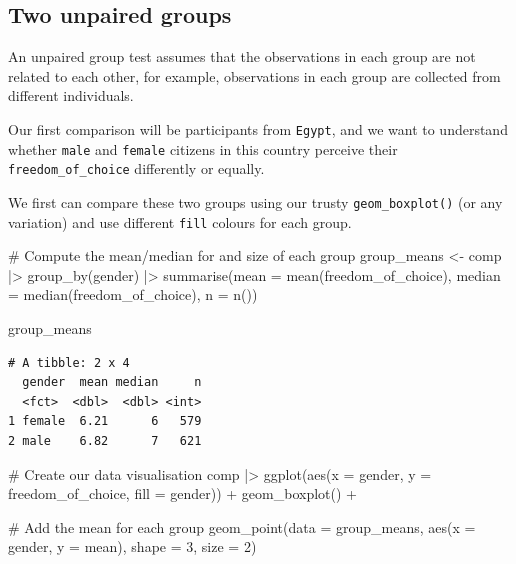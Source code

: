 \documentclass[
  letterpaper,
  DIV=11,
  numbers=noendperiod]{scrreprt}
\newenvironment{Shaded}{\begin{snugshade}}{\end{snugshade}}
\newcommand{\AttributeTok}[1]{\textcolor[rgb]{0.40,0.45,0.13}{#1}}
\newcommand{\CommentTok}[1]{\textcolor[rgb]{0.37,0.37,0.37}{#1}}
\newcommand{\DecValTok}[1]{\textcolor[rgb]{0.68,0.00,0.00}{#1}}
\newcommand{\FunctionTok}[1]{\textcolor[rgb]{0.28,0.35,0.67}{#1}}
\newcommand{\NormalTok}[1]{\textcolor[rgb]{0.00,0.23,0.31}{#1}}
\newcommand{\OtherTok}[1]{\textcolor[rgb]{0.00,0.23,0.31}{#1}}
\newcommand{\SpecialCharTok}[1]{\textcolor[rgb]{0.37,0.37,0.37}{#1}}
\begin{document}
\subsection{Two unpaired groups}\label{sec-two-unpaired-groups}

An unpaired group test assumes that the observations in each group are
not related to each other, for example, observations in each group are
collected from different individuals.

Our first comparison will be participants from \texttt{Egypt}, and we
want to understand whether \texttt{male} and \texttt{female} citizens in
this country perceive their \texttt{freedom\_of\_choice} differently or
equally.

We first can compare these two groups using our trusty
\texttt{geom\_boxplot()} (or any variation) and use different
\texttt{fill} colours for each group.

\begin{Shaded}
\begin{Highlighting}[]
\CommentTok{\# Compute the mean/median for and size of each group}
\NormalTok{group\_means }\OtherTok{\textless{}{-}}
\NormalTok{  comp }\SpecialCharTok{|\textgreater{}}
  \FunctionTok{group\_by}\NormalTok{(gender) }\SpecialCharTok{|\textgreater{}}
  \FunctionTok{summarise}\NormalTok{(}\AttributeTok{mean =} \FunctionTok{mean}\NormalTok{(freedom\_of\_choice),}
            \AttributeTok{median =} \FunctionTok{median}\NormalTok{(freedom\_of\_choice),}
            \AttributeTok{n =} \FunctionTok{n}\NormalTok{())}

\NormalTok{group\_means}
\end{Highlighting}
\end{Shaded}

\begin{verbatim}
# A tibble: 2 x 4
  gender  mean median     n
  <fct>  <dbl>  <dbl> <int>
1 female  6.21      6   579
2 male    6.82      7   621
\end{verbatim}

\begin{Shaded}
\begin{Highlighting}[]
\CommentTok{\# Create our data visualisation}
\NormalTok{comp }\SpecialCharTok{|\textgreater{}}
  \FunctionTok{ggplot}\NormalTok{(}\FunctionTok{aes}\NormalTok{(}\AttributeTok{x =}\NormalTok{ gender, }\AttributeTok{y =}\NormalTok{ freedom\_of\_choice, }\AttributeTok{fill =}\NormalTok{ gender)) }\SpecialCharTok{+}
  \FunctionTok{geom\_boxplot}\NormalTok{() }\SpecialCharTok{+}

  \CommentTok{\# Add the mean for each group}
  \FunctionTok{geom\_point}\NormalTok{(}\AttributeTok{data =}\NormalTok{ group\_means,}
             \FunctionTok{aes}\NormalTok{(}\AttributeTok{x =}\NormalTok{ gender, }\AttributeTok{y =}\NormalTok{ mean),}
             \AttributeTok{shape =} \DecValTok{3}\NormalTok{,}
             \AttributeTok{size =} \DecValTok{2}\NormalTok{)}
\end{Highlighting}
\end{Shaded}
\end{document}
